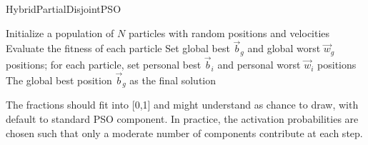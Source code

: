 {\vspace{.935em}
\begin{algorithm}[H]
\caption{HybridPartialDisjointPSO}\label{alg:hybridadditive}
Initialize a population of \(N\) particles with random positions and velocities\;  
Evaluate the fitness of each particle\;  
Set global best \(\vec{b}_g\) and global worst \(\vec{w}_g\) positions; for each particle, set personal best \(\vec{b}_i\) and personal worst \(\vec{w}_i\) positions\;  
\Return The global best position \(\vec{b}_g\) as the final solution \;
\end{algorithm}






The fractions should fit into [0,1] and might understand as chance to draw, with default to standard PSO component.
In practice, the activation probabilities are chosen such that only a moderate number of components contribute at each step. 












}